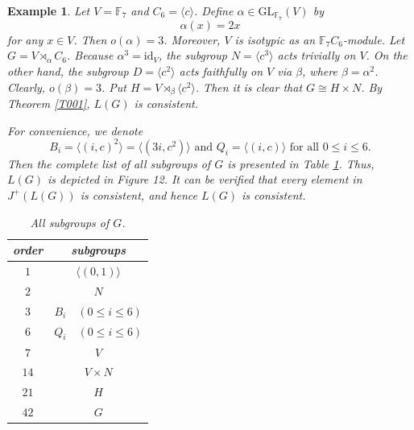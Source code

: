 \documentclass[12pt]{article}
\newtheorem{example}{\bf Example}[section]
\begin{document}
\begin{example}\label{example003}
\emph{Let $V=\mathbb{F}_{7}$ and $C_6=\langle c\rangle$. Define $\alpha\in \mbox{GL}_{\mathbb{F}_{7}}(V)$ by $$\alpha(x)=2x$$ for any $x\in V$.
Then $o(\alpha)=3$. Moreover, $V$ is isotypic as an $\mathbb{F}_7C_6$-module. 
Let $G=V\rtimes_{\alpha} C_6$. Because $\alpha^3=\mbox{id}_V$, the subgroup $N=\langle c^3\rangle$ acts trivially on $V$. 
On the other hand, the subgroup $D=\langle c^2\rangle$ acts faithfully on $V$ via $\beta$, where $\beta=\alpha^2$. 
Clearly, $o(\beta)=3$. Put $H=V\rtimes_{\beta} \langle c^2\rangle$. Then it is clear that $G\cong H\times N$. By Theorem \ref{T001}, $L(G)$ is consistent.} 

\emph{For convenience, we denote $$B_i=\langle (i,c)^2\rangle=\langle (3i,c^2)\rangle \mbox{ and } Q_i=\langle (i, c)\rangle \mbox{ for all } 0\leq i\leq 6.$$ Then the complete list of all subgroups of $G$ is presented in Table \ref{Tab:03}. Thus, $L(G)$ is depicted in Figure 12. 
It can be verified that every element in $J^{+}(L(G))$ is consistent, and hence $L(G)$ is consistent.}
\begin{table}[!h]
\centering
\caption{All subgroups of $G$.}
\label{Tab:03}
\begin{tabular}{c|c}
order & subgroups \\
 \hline
 $1$ & $\langle (0,1)\rangle$ \\
 $2$ & $N$  \\
 $3$ & $B_i \quad (0\leq i\leq 6)$ \\
 $6$ & $Q_i \quad (0\leq i\leq 6)$  \\
 $7$ & $V$  \\
 $14$ & $V\times N$ \\
 $21$ & $H$ \\
 $42$ & $G$ \\
 \end{tabular}
\end{table}



\end{example}
\end{document}
